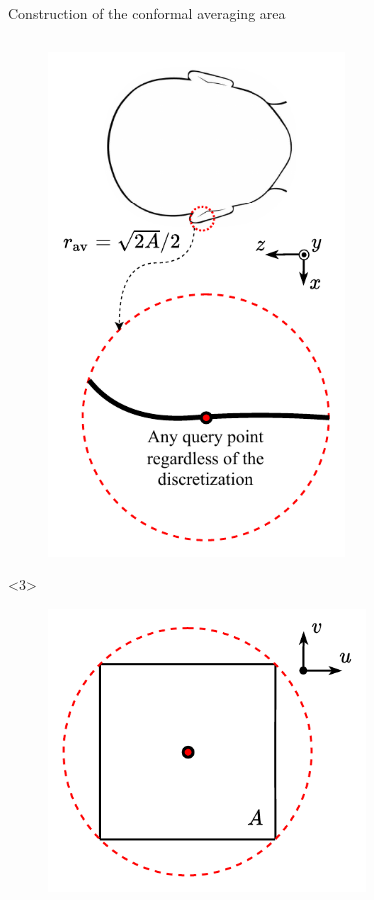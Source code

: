 \documentclass[xcolor=dvipsnames,10pt]{beamer}
\begin{document}
\begin{frame}{Construction of the conformal averaging area}
\begin{columns}[c]
\begin{column}{0.5\textwidth}
\begin{onlyenv}
\begin{center}
\begin{figure}
                    \includegraphics[width=0.7\textwidth]{artwork/averaging_area_construction.adjusted.pdf}
                \end{figure}
                \end{center}
            \end{onlyenv}
            \begin{onlyenv}<3>
                \begin{center}
                \begin{figure}
                    \includegraphics[width=0.75\textwidth]{artwork/averaging_area_construction.param.pdf}

\end{figure}
\end{center}
\end{onlyenv}
\end{column}
\end{columns}
\end{frame}
\end{document}
